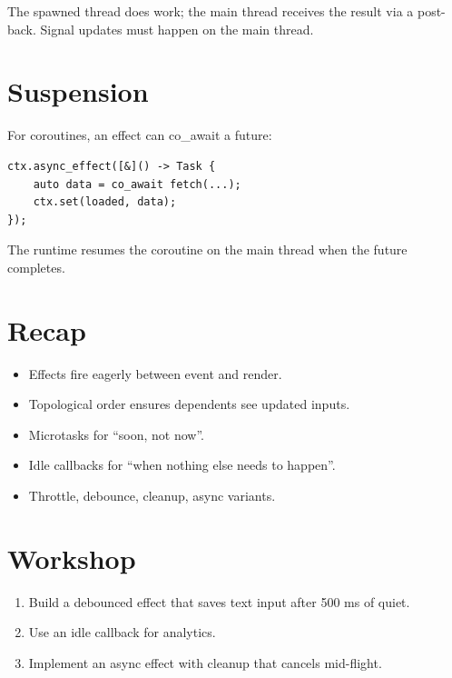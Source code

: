 The spawned thread does work; the main thread receives the
result via a post-back. Signal updates must happen on the
main thread.

\section{Suspension}

For coroutines, an effect can co\_await a future:

\begin{lstlisting}
ctx.async_effect([&]() -> Task {
    auto data = co_await fetch(...);
    ctx.set(loaded, data);
});
\end{lstlisting}

The runtime resumes the coroutine on the main thread when
the future completes.

\section{Recap}

\begin{recap}
\begin{itemize}[leftmargin=*]
  \item Effects fire eagerly between event and render.
  \item Topological order ensures dependents see updated
    inputs.
  \item Microtasks for ``soon, not now''.
  \item Idle callbacks for ``when nothing else needs to
    happen''.
  \item Throttle, debounce, cleanup, async variants.
\end{itemize}
\end{recap}

\section*{Workshop}

\begin{enumerate}[leftmargin=*]
  \item Build a debounced effect that saves text input
    after 500 ms of quiet.
  \item Use an idle callback for analytics.
  \item Implement an async effect with cleanup that
    cancels mid-flight.
\end{enumerate}
